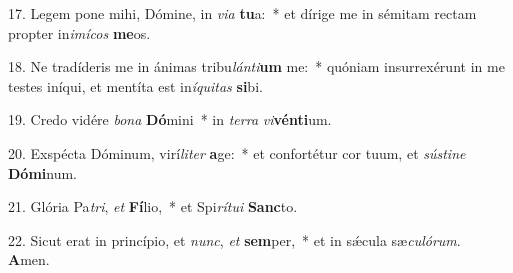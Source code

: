 17. Legem pone mihi, Dómine, in \textit{vi}\textit{a} \textbf{tu}a:~*  et dírige me in sémitam rectam propter in\textit{i}\textit{mí}\textit{cos} \textbf{me}os.\

18. Ne tradíderis me in ánimas tribu\textit{lán}\textit{ti}\textbf{um} me:~*  quóniam insurrexérunt in me testes iníqui, et mentíta est in\textit{í}\textit{qui}\textit{tas} \textbf{si}bi.\

19. Credo vidére \textit{bo}\textit{na} \textbf{Dó}mini~*  in \textit{ter}\textit{ra} \textit{vi}\textbf{vén}\textbf{ti}um.\

20. Exspécta Dóminum, virí\textit{li}\textit{ter} \textbf{a}ge:~*  et confortétur cor tuum, et \textit{sús}\textit{ti}\textit{ne} \textbf{Dó}\textbf{mi}num.\

21. Glória Pa\textit{tri}, \textit{et} \textbf{Fí}lio,~*  et Spi\textit{rí}\textit{tu}\textit{i} \textbf{Sanc}to.\

22. Sicut erat in princípio, et \textit{nunc}, \textit{et} \textbf{sem}per,~*  et in sǽcula sæ\textit{cu}\textit{ló}\textit{rum}. \textbf{A}men.\

